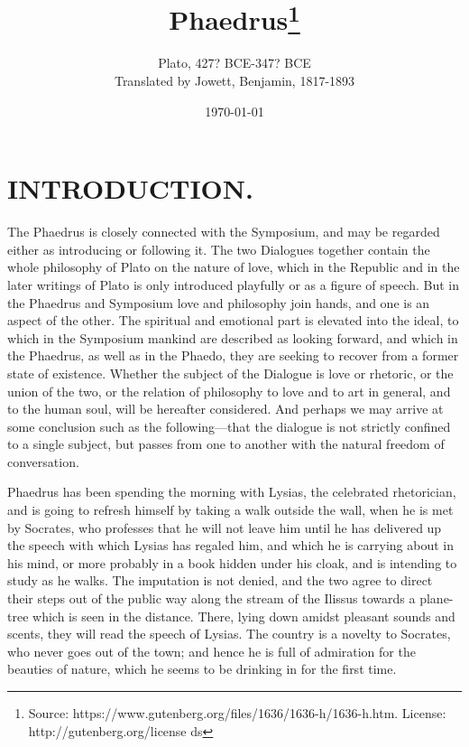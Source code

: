 \documentclass[11pt,letter]{article}
\begin{document}
\title{Phaedrus\thanks{Source: https://www.gutenberg.org/files/1636/1636-h/1636-h.htm. License: http://gutenberg.org/license ds}}
\date{\today}
\author{Plato, 427? BCE-347? BCE\\ Translated by Jowett, Benjamin, 1817-1893}
\maketitle

\setcounter{tocdepth}{1}
\tableofcontents
\renewcommand{\baselinestretch}{1.0}
\normalsize
\newpage

\section{
      INTRODUCTION.
    }
\par  The Phaedrus is closely connected with the Symposium, and may be regarded either as introducing or following it. The two Dialogues together contain the whole philosophy of Plato on the nature of love, which in the Republic and in the later writings of Plato is only introduced playfully or as a figure of speech. But in the Phaedrus and Symposium love and philosophy join hands, and one is an aspect of the other. The spiritual and emotional part is elevated into the ideal, to which in the Symposium mankind are described as looking forward, and which in the Phaedrus, as well as in the Phaedo, they are seeking to recover from a former state of existence. Whether the subject of the Dialogue is love or rhetoric, or the union of the two, or the relation of philosophy to love and to art in general, and to the human soul, will be hereafter considered. And perhaps we may arrive at some conclusion such as the following—that the dialogue is not strictly confined to a single subject, but passes from one to another with the natural freedom of conversation.

\par  Phaedrus has been spending the morning with Lysias, the celebrated rhetorician, and is going to refresh himself by taking a walk outside the wall, when he is met by Socrates, who professes that he will not leave him until he has delivered up the speech with which Lysias has regaled him, and which he is carrying about in his mind, or more probably in a book hidden under his cloak, and is intending to study as he walks. The imputation is not denied, and the two agree to direct their steps out of the public way along the stream of the Ilissus towards a plane-tree which is seen in the distance. There, lying down amidst pleasant sounds and scents, they will read the speech of Lysias. The country is a novelty to Socrates, who never goes out of the town; and hence he is full of admiration for the beauties of nature, which he seems to be drinking in for the first time.
\end{document}
